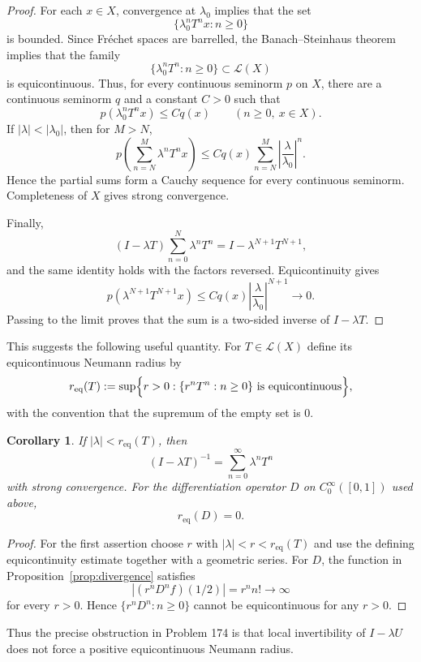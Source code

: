 \documentclass[11pt]{article}
\newtheorem{corollary}[theorem]{Corollary}
\theoremstyle{remark}
\newcommand{\Lcal}{\mathcal L}
\newcommand{\peq}{r_{\mathrm{eq}}}
\begin{document}
\begin{proof}
For each $x\in X$, convergence at $\lambda_0$ implies that the set
\[
   \{\lambda_0^nT^nx:n\ge0\}
\]
is bounded.  Since Fr\'echet spaces are barrelled, the Banach--Steinhaus theorem implies
that the family
\[
   \{\lambda_0^nT^n:n\ge0\}\subset\Lcal(X)
\]
is equicontinuous.  Thus, for every continuous seminorm $p$ on $X$, there are a
continuous seminorm $q$ and a constant $C>0$ such that
\[
   p(\lambda_0^nT^nx)\le Cq(x)
   \qquad(n\ge0,\ x\in X).
\]
If $|\lambda|<|\lambda_0|$, then for $M>N$,
\[
 p\!\left(\sum_{n=N}^{M}\lambda^nT^nx\right)
 \le Cq(x)\sum_{n=N}^{M}
       \left|\frac{\lambda}{\lambda_0}\right|^n.
\]
Hence the partial sums form a Cauchy sequence for every continuous seminorm.  Completeness
of $X$ gives strong convergence.

Finally,
\[
 (I-\lambda T)\sum_{n=0}^{N}\lambda^nT^n
   =I-\lambda^{N+1}T^{N+1},
\]
and the same identity holds with the factors reversed.  Equicontinuity gives
\[
 p(\lambda^{N+1}T^{N+1}x)
 \le Cq(x)\left|\frac{\lambda}{\lambda_0}\right|^{N+1}\longrightarrow0.
\]
Passing to the limit proves that the sum is a two-sided inverse of $I-\lambda T$.
\end{proof}

This suggests the following useful quantity.  For $T\in\Lcal(X)$ define its
equicontinuous Neumann radius by
\[
  \peq(T):=
  \sup\Bigl\{r>0:\{r^nT^n:n\ge0\}\text{ is equicontinuous}\Bigr\},
\]
with the convention that the supremum of the empty set is $0$.

\begin{corollary}\label{cor:req}
If $|\lambda|<\peq(T)$, then
\[
   (I-\lambda T)^{-1}=\sum_{n=0}^{\infty}\lambda^nT^n
\]
with strong convergence.  For the differentiation operator $D$ on
$C_0^\infty([0,1])$ used above,
\[
   \peq(D)=0.
\]
\end{corollary}

\begin{proof}
For the first assertion choose $r$ with $|\lambda|<r<\peq(T)$ and use the defining
equicontinuity estimate together with a geometric series.  For $D$, the function in
Proposition~\ref{prop:divergence} satisfies
\[
   |(r^nD^nf)(1/2)|=r^nn!\to\infty
\]
for every $r>0$.  Hence $\{r^nD^n:n\ge0\}$ cannot be equicontinuous for any $r>0$.
\end{proof}

Thus the precise obstruction in Problem 174 is that local invertibility of
$I-\lambda U$ does not force a positive equicontinuous Neumann radius.
\end{document}
